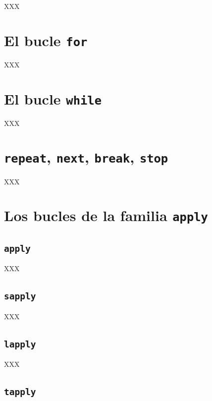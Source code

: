 \documentclass[]{book}
\begin{document}
XXX

\section{\texorpdfstring{El bucle
\texttt{for}}{El bucle for}}\label{el-bucle-for}

XXX

\section{\texorpdfstring{El bucle
\texttt{while}}{El bucle while}}\label{el-bucle-while}

XXX

\section{\texorpdfstring{\texttt{repeat}, \texttt{next}, \texttt{break},
\texttt{stop}}{repeat, next, break, stop}}\label{repeat-next-break-stop}

XXX

\section{\texorpdfstring{Los bucles de la familia
\texttt{apply}}{Los bucles de la familia apply}}\label{los-bucles-de-la-familia-apply}

\subsection{\texorpdfstring{\texttt{apply}}{apply}}\label{apply}

XXX

\subsection{\texorpdfstring{\texttt{sapply}}{sapply}}\label{sapply}

XXX

\subsection{\texorpdfstring{\texttt{lapply}}{lapply}}\label{lapply}

XXX

\subsection{\texorpdfstring{\texttt{tapply}}{tapply}}\label{tapply}
\end{document}
